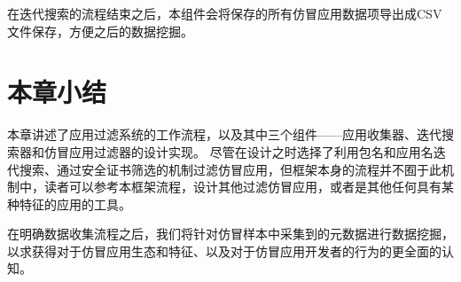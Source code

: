 在迭代搜索的流程结束之后，本组件会将保存的所有仿冒应用数据项导出成CSV文件保存，方便之后的数据挖掘。

\section{本章小结}
本章讲述了应用过滤系统\mytool 的工作流程，以及其中三个组件——应用收集器、迭代搜索器和仿冒应用过滤器的设计实现。
尽管\mytool 在设计之时选择了利用包名和应用名迭代搜索、通过安全证书筛选的机制过滤仿冒应用，但框架本身的流程并不囿于此机制中，读者可以参考本框架流程，设计其他过滤仿冒应用，或者是其他任何具有某种特征的应用的工具。

在明确数据收集流程之后，我们将针对仿冒样本中采集到的元数据进行数据挖掘，以求获得对于仿冒应用生态和特征、以及对于仿冒应用开发者的行为的更全面的认知。
